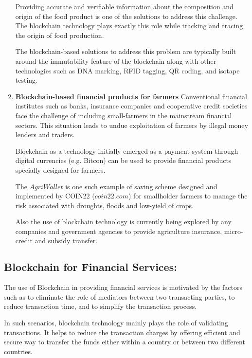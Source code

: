\documentclass[10pt]{IETBook}
\begin{document}
\begin{enumerate}
    Providing accurate and verifiable information  about the composition and origin of the food product is one of the solutions to address this challenge. The blockchain technology plays exactly this role while tracking and tracing the origin of food production.
    
    The blockchain-based solutions to address this problem are typically built around the immutability feature of the blockchain  along with other technologies such  as DNA marking, RFID tagging, QR coding, and isotape testing.
    
    \item {\bf Blockchain-based financial products for farmers}
    Conventional financial institutes such as banks, insurance companies and cooperative credit societies face the challenge of including small-farmers in the mainstream financial sectors. This situation leads to undue exploitation of farmers by illegal money lenders and traders.
    
    Blockchain as a technology initially emerged as a payment system through digital currencies (e.g. Bitcon) can be used to provide financial products specially designed for farmers.
    
   The $AgriWallet$ is one such example of saving scheme designed and implemented by COIN22 ($coin22.com$) for smallholder farmers to manage the risk  associated with droughts, floods and low-yield of crops. \cite{fao}
   
   Also the use of blockchain technology is currently being explored by any companies and government agencies to provide agriculture insurance, micro-credit and subsidy transfer. \cite{bermeo2018blockchain}
 
 
\end {enumerate}
	
\subsection{Blockchain for Financial Services:}

The  use of Blockchain in providing  financial services is motivated by the factors such as to eliminate the  role of mediators between  two transacting  parties,  to reduce  transaction time, and to simplify the transaction process. 

In such scenarios,  blockchain technology mainly plays the role of  validating  transactions. 
It helps to reduce the transaction charges by offering  efficient and secure way to transfer the funds either within a country or between two different countries. 
\end{document}
